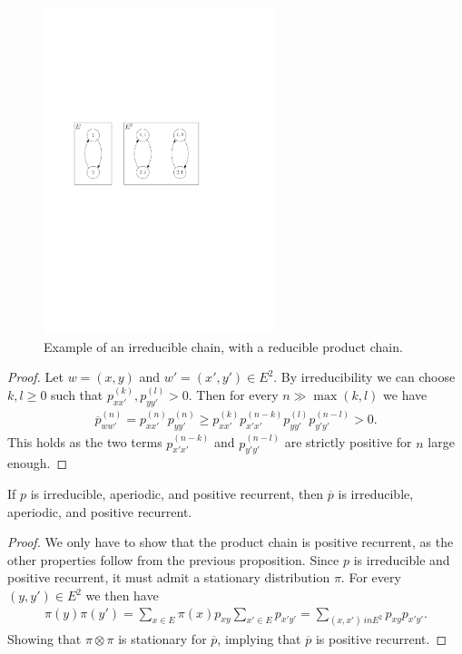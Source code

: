 \begin{figure}[h!]
\centering
\includegraphics[width=0.6\textwidth]{figures/non_irred_prod_chain.pdf}
\caption{Example of an irreducible chain, with a reducible product chain.}
\end{figure}

\begin{proof}
	Let $w=(x,y)$ and $w'=(x',y') \in E^2$. By irreducibility we can choose $k,l\geq 0$ such that $p_{xx'}^{(k)}, p_{yy'}^{(l)} >0$. Then for every $n \gg \max(k,l)$ we have
\begin{align}
	\overline{p}_{ww'}^{(n)} = p_{xx'}^{(n)}p_{yy'}^{(n)} \geq p_{xx'}^{(k)}p_{x'x'}^{(n-k)} p_{yy'}^{(l)} p_{y'y'}^{(n-l)} > 0.
\end{align}
This holds as the two terms $p_{x'x'}^{(n-k)}$ and $p_{y'y'}^{(n-l)}$ are strictly positive for $n$ large enough.
\end{proof}

\begin{prop}[]
	If $p$ is irreducible, aperiodic, and positive recurrent, then $\overline{p}$ is irreducible, aperiodic, and positive recurrent.
\end{prop}
\begin{proof}
	We only have to show that the product chain is positive recurrent, as the other properties follow from the previous proposition. Since $p$ is irreducible and positive recurrent, it must admit a stationary distribution $\pi $. For every $(y,y')\in E^2$ we then have
\begin{align}
	\pi (y) \pi (y') = \sum_{x \in E}^{} \pi(x)p_{xy} \sum_{x' \in E}^{}p_{x'y'} = \sum_{(x,x')\ in E^2}^{} p_{xy}p_{x'y'}. 
\end{align}
Showing that $\pi \otimes \pi $ is stationary for $\overline{p}$, implying that $\overline{p}$ is positive recurrent.

\end{proof}


